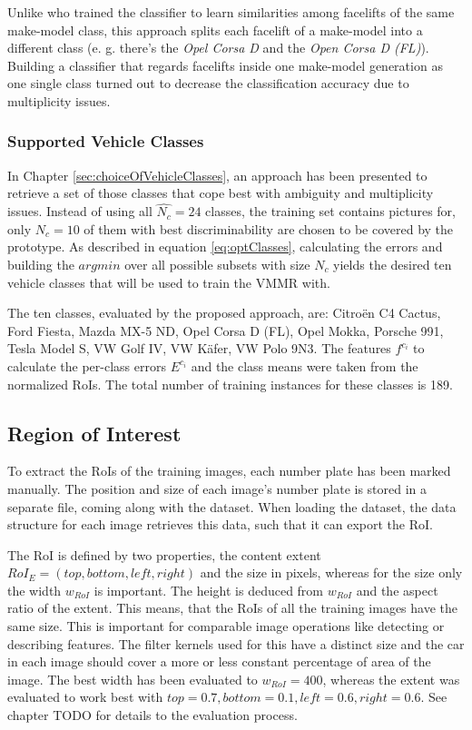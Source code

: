 Unlike \citep{siddiqui2015robust} who trained the classifier to learn similarities among facelifts of the same make-model class, this approach splits each facelift of a make-model into a different class (e. g. there's the \emph{Opel Corsa D} and the \emph{Open Corsa D (FL)}). Building a classifier that regards facelifts inside one make-model generation as one single class turned out to decrease the classification accuracy due to multiplicity issues.

\subsubsection{Supported Vehicle Classes}\label{sec:supportedVehicleClassesImpl}
In Chapter \ref{sec:choiceOfVehicleClasses}, an approach has been presented to retrieve a set of those classes that cope best with ambiguity and multiplicity issues. Instead of using all $\hat{N_c} = 24$ classes, the training set contains pictures for, only $N_c = 10$ of them with best discriminability are chosen to be covered by the prototype. As described in equation \ref{eq:optClasses}, calculating the errors and building the $argmin$ over all possible subsets with size $N_c$ yields the desired ten vehicle classes that will be used to train the VMMR with.

The ten classes, evaluated by the proposed approach, are: Citro\"en C4 Cactus, Ford Fiesta, Mazda MX-5 ND, Opel Corsa D (FL), Opel Mokka, Porsche 991, Tesla Model S, VW Golf IV, VW K\"afer, VW Polo 9N3. The features $f^{c_i}$ to calculate the per-class errors $E^{c_i}$ and the class means were taken from the normalized RoIs. The total number of training instances for these classes is 189.

\subsection{Region of Interest}
To extract the RoIs of the training images, each number plate has been marked manually. The position and size of each image's number plate is stored in a separate file, coming along with the dataset. When loading the dataset, the data structure for each image retrieves this data, such that it can export the RoI.

The RoI is defined by two properties, the content extent $RoI_E = (top, bottom, left, right)$ and the size in pixels, whereas for the size only the width $w_{RoI}$ is important. The height is deduced from $w_{RoI}$ and the aspect ratio of the extent. This means, that the RoIs of all the training images have the same size. This is important for comparable image operations like detecting or describing features. The filter kernels used for this have a distinct size and the car in each image should cover a more or less constant percentage of area of the image. The best width has been evaluated to $w_{RoI} = 400$, whereas the extent was evaluated to work best with $top = 0.7, bottom = 0.1, left = 0.6, right = 0.6$. See chapter TODO for details to the evaluation process.

